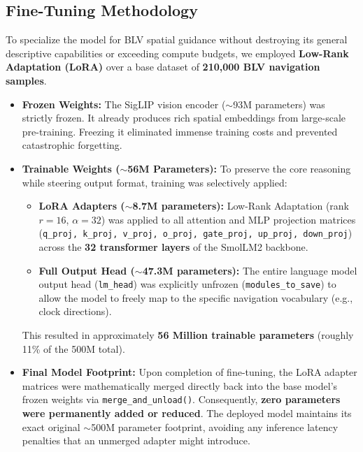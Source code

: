 \documentclass[11pt,a4paper]{article}
\begin{document}
\subsection{Fine-Tuning Methodology}
To specialize the model for BLV spatial guidance without destroying its general descriptive capabilities or exceeding compute budgets, we employed \textbf{Low-Rank Adaptation (LoRA)} over a base dataset of \textbf{210,000 BLV navigation samples}.
\begin{itemize}
    \item \textbf{Frozen Weights:} The SigLIP vision encoder ($\sim$93M parameters) was strictly frozen. It already produces rich spatial embeddings from large-scale pre-training. Freezing it eliminated immense training costs and prevented catastrophic forgetting.
    \item \textbf{Trainable Weights ($\sim$56M Parameters):} To preserve the core reasoning while steering output format, training was selectively applied:
    \begin{itemize}
        \item \textbf{LoRA Adapters ($\sim$8.7M parameters):} Low-Rank Adaptation (rank $r=16$, $\alpha=32$) was applied to all attention and MLP projection matrices (\texttt{q\_proj, k\_proj, v\_proj, o\_proj, gate\_proj, up\_proj, down\_proj}) across the \textbf{32 transformer layers} of the SmolLM2 backbone.
        \item \textbf{Full Output Head ($\sim$47.3M parameters):} The entire language model output head (\texttt{lm\_head}) was explicitly unfrozen (\texttt{modules\_to\_save}) to allow the model to freely map to the specific navigation vocabulary (e.g., clock directions).
    \end{itemize}
    This resulted in approximately \textbf{56 Million trainable parameters} (roughly 11\% of the 500M total).
    \item \textbf{Final Model Footprint:} Upon completion of fine-tuning, the LoRA adapter matrices were mathematically merged directly back into the base model's frozen weights via \texttt{merge\_and\_unload()}. Consequently, \textbf{zero parameters were permanently added or reduced}. The deployed model maintains its exact original $\sim$500M parameter footprint, avoiding any inference latency penalties that an unmerged adapter might introduce.
\end{itemize}
\end{document}
